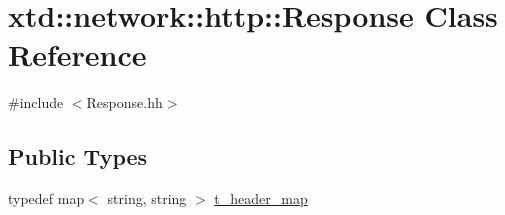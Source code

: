 \hypertarget{classxtd_1_1network_1_1http_1_1Response}{}\section{xtd\+:\+:network\+:\+:http\+:\+:Response Class Reference}
\label{classxtd_1_1network_1_1http_1_1Response}


{\ttfamily \#include $<$Response.\+hh$>$}

\subsection*{Public Types}
\begin{DoxyCompactItemize}
\item 
typedef map$<$ string, string $>$ \hyperlink{classxtd_1_1network_1_1http_1_1Response_a77c534464429597bc4faa6bb556a8b53}{t\+\_\+header\+\_\+map}
\end{DoxyCompactItemize}
